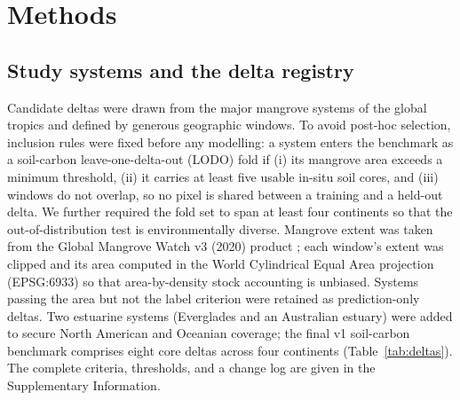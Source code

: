 \documentclass[11pt]{article}
\begin{document}
\section{Methods}

\subsection{Study systems and the delta registry}
Candidate deltas were drawn from the major mangrove systems of the global tropics and
defined by generous geographic windows. To avoid post-hoc selection, inclusion rules
were fixed before any modelling: a system enters the benchmark as a soil-carbon
leave-one-delta-out (LODO) fold if (i) its mangrove area exceeds a minimum threshold,
(ii) it carries at least five usable in-situ soil cores, and (iii) windows do not
overlap, so no pixel is shared between a training and a held-out delta. We further
required the fold set to span at least four continents so that the out-of-distribution
test is environmentally diverse. Mangrove extent was taken from the Global Mangrove
Watch v3 (2020) product \citep{bunting2022gmw3}; each window's extent was clipped and
its area computed in the World Cylindrical Equal Area projection (EPSG:6933) so that
area-by-density stock accounting is unbiased. Systems passing the area but not the
label criterion were retained as prediction-only deltas. Two estuarine systems
(Everglades and an Australian estuary) were added to secure North American and
Oceanian coverage; the final v1 soil-carbon benchmark comprises eight core deltas
across four continents (Table~\ref{tab:deltas}). The complete criteria, thresholds,
and a change log are given in the Supplementary Information.
\end{document}
